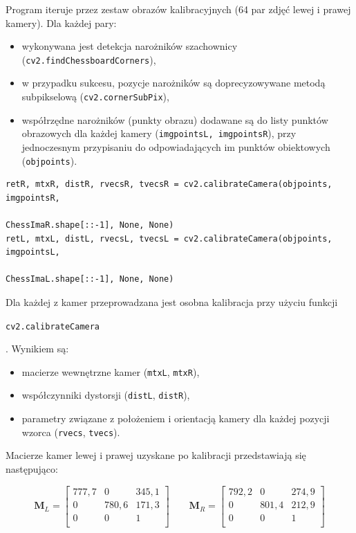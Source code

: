 \documentclass[magisterska]{pracadypl}
\begin{document}
Program iteruje przez zestaw obrazów kalibracyjnych (64 par zdjęć lewej i prawej kamery). Dla każdej pary:

\begin{itemize}
  \item wykonywana jest detekcja narożników szachownicy (\texttt{cv2.findChessboardCorners}),
  \item w przypadku sukcesu, pozycje narożników są doprecyzowywane metodą subpikselową (\texttt{cv2.cornerSubPix}),
  \item współrzędne narożników (punkty obrazu) dodawane są do listy punktów obrazowych dla każdej kamery (\texttt{imgpointsL, imgpointsR}), przy jednoczesnym przypisaniu do odpowiadających im punktów obiektowych (\texttt{objpoints}).
\end{itemize}

\begin{lstlisting}[style=mypython]
retR, mtxR, distR, rvecsR, tvecsR = cv2.calibrateCamera(objpoints, imgpointsR, 
                                                      ChessImaR.shape[::-1], None, None)
retL, mtxL, distL, rvecsL, tvecsL = cv2.calibrateCamera(objpoints, imgpointsL,
                                                      ChessImaL.shape[::-1], None, None)
\end{lstlisting}

Dla każdej z kamer przeprowadzana jest osobna kalibracja przy użyciu funkcji {\sloppy \texttt{cv2.calibrateCamera} \par}. Wynikiem są:

\begin{itemize}
  \item macierze wewnętrzne kamer (\texttt{mtxL}, \texttt{mtxR}),
  \item współczynniki dystorsji (\texttt{distL}, \texttt{distR}),
  \item parametry związane z położeniem i orientacją kamery dla każdej pozycji wzorca (\texttt{rvecs}, \texttt{tvecs}).
\end{itemize}

Macierze kamer lewej i prawej uzyskane po kalibracji przedstawiają się następująco:

\[
\mathbf{M}_L =
\begin{bmatrix}
777,7 & 0 & 345,1 \\
0 & 780,6 & 171,3 \\
0 & 0 & 1 \\
\end{bmatrix}
\qquad
\mathbf{M}_R =
\begin{bmatrix}
792,2 & 0 & 274,9 \\
0 & 801,4 & 212,9 \\
0 & 0 & 1 \\
\end{bmatrix}
\]
\end{document}
